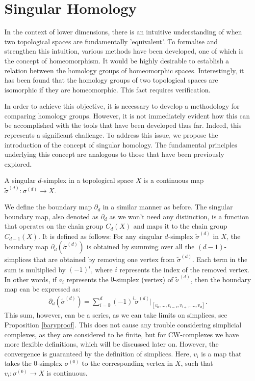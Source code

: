 \section{Singular Homology}
\label{SingularHomology}
In the context of lower dimensions, there is an intuitive understanding of when two topological spaces are fundamentally 'equivalent'. To formalise and strengthen this intuition, various methods have been developed, one of which is the concept of homeomorphism. It would be highly desirable to establish a relation between the homology groups of homeomorphic spaces. Interestingly, it has been found that the homology groups of two topological spaces are isomorphic if they are homeomorphic. This fact requires verification.

In order to achieve this objective, it is necessary to develop a methodology for comparing homology groups. However, it is not immediately evident how this can be accomplished with the tools that have been developed thus far. Indeed, this represents a significant challenge. To address this issue, we propose the introduction of the concept of singular homology. The fundamental principles underlying this concept are analogous to those that have been previously explored.

\begin{definition}
	A singular \( d \)-simplex in a topological space \( X \) is a continuous map \( \tilde{\sigma}^{(d)}: \sigma^{(d)} \to X \).
\end{definition}

We define the boundary map \( \partial_{d} \) in a similar manner as before. The singular boundary map, also denoted as \( \partial_{d} \) as we won't need any distinction, is a function that operates on the chain group \( C_{d}(X) \) and maps it to the chain group \( C_{d-1}(X) \). It is defined as follows: For any singular \( d \)-simplex \( \tilde{\sigma}^{(d)} \) in \( X \), the boundary map \( \partial_{d}(\tilde{\sigma}^{(d)}) \) is obtained by summing over all the \( (d-1) \)-simplices that are obtained by removing one vertex from \( \tilde{\sigma}^{(d)} \). Each term in the sum is multiplied by \( (-1)^{i} \), where \( i \) represents the index of the removed vertex. In other words, if \( v_{i} \) represents the \( 0 \)-simplex (vertex) of \( \tilde{\sigma}^{(d)} \), then the boundary map can be expressed as:
\begin{align}
	\partial_{d}(\tilde{\sigma}^{(d)}) = \sum_{i=0}^{d} (-1)^{i} \tilde{\sigma}^{(d)}\vert_{[v_0, \ldots, v_{i-1}, v_{i+1}, \ldots, v_d]}. 
\end{align}
This sum, however, can be a series, as we can take limits on simplices, see Proposition \ref{baryproof}. This does not cause any trouble considering simplicial complexes, as they are considered to be finite, but for CW-complexes we have more flexible definitions, which will be discussed later on. However, the convergence is guaranteed by the definition of simplices. Here, \( v_{i} \) is a map that takes the \( 0 \)-simplex \( \sigma^{(0)} \) to the corresponding vertex in \( X \), such that \( v_{i}: \sigma^{(0)} \to X \) is continuous.


